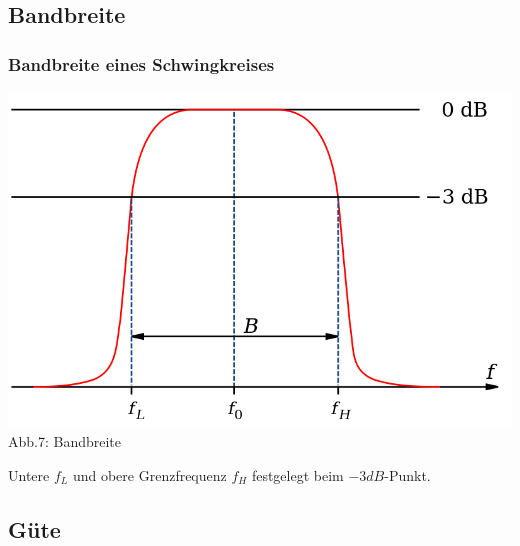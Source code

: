 


\subsection*{Bandbreite}
\begin{frame}
  \frametitle{Bandbreite eines Schwingkreises}
  \begin{center}
    \includegraphics[scale=0.3]{a04/bandwidth.png}\\
    \tiny{Abb.7: Bandbreite \cite{wmen}}
  \end{center}
  Untere $f_L$ und obere Grenzfrequenz $f_H$ festgelegt beim $-3dB$-Punkt.
\end{frame}

\subsection*{Güte}

